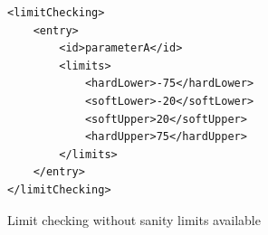 \begin{table}[H]
\lstset{language=XML}
\begin{lstlisting}
<limitChecking>
	<entry>
		<id>parameterA</id>
		<limits>
			<hardLower>-75</hardLower>
			<softLower>-20</softLower>
			<softUpper>20</softUpper>
			<hardUpper>75</hardUpper>
		</limits>
	</entry>
</limitChecking>
\end{lstlisting}
\caption{Limit checking without sanity limits available}
\label{Table5.x}
\end{table}


\newpage

